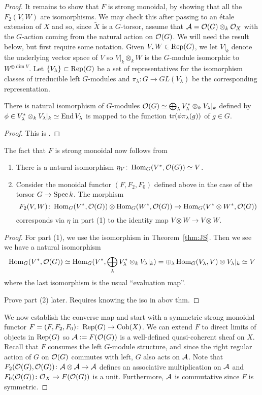 \documentclass[12pt]{amsart}
\begin{document}
\begin{proof}
It remains to show that $F$ is strong monoidal, by showing that all the $F_2(V,W)$ are isomorphisms. We may check this after passing to an \'etale extension of $X$ and so, since $\tilde{X}$ is a $G$-torsor, assume that $\mathcal{A}  = \mathcal{O}(G) \otimes_k \mathcal{O}_X$ with the $G$-action coming from the natural action on $\mathcal{O}(G)$. We will need the result below, but first require some notation. Given $V, W \in \operatorname{Rep}(G)$, we let $V|_k$ denote the underlying vector space of $V$ so $V|_k \otimes_k W$ is the $G$-module isomorphic to $W^{\oplus \dim V}$. Let $\{V_{\lambda}\}\subset \operatorname{Rep}(G)$ be a set of representatives for the isomorphism classes of irreducible left $G$-modules and $\pi_{\lambda} \colon G \to GL(V_{\lambda})$ be the corresponding representation. 
\begin{theorem}  \label{thm:JS}
There is natural isomorphism of $G$-modules 
$\mathcal{O}(G) \simeq \bigoplus_{\lambda}  V_{\lambda}^* \otimes_k V_{\lambda}|_k$ defined by $\phi \in V_{\lambda}^* \otimes_k V_{\lambda}|_k \simeq \operatorname{End} V_{\lambda}$ is mapped to the function $\operatorname{tr}(\phi \pi_{\lambda}(g))$ of $g \in G$.
\end{theorem}
\begin{proof}
This is \cite[\S2, Theorem~7, \S3, Theorem~1]{JS}.
\end{proof}
The fact that $F$ is strong monoidal now follows from
\begin{lemma}  \label{lem:HomOG}
\begin{enumerate}
    \item There is a natural isomorphism $\eta_V \colon \operatorname{Hom}_G(V^*,\mathcal{O}(G))\simeq V$.
    \item Consider the  monoidal functor $(F,F_2,F_0)$ defined above in the case of the torsor $G \to \operatorname{Spec} k$. The morphism
    $$ F_2(V,W) \colon \operatorname{Hom}_G(V^*,\mathcal{O}(G)) \otimes \operatorname{Hom}_G(W^*,\mathcal{O}(G)) \to \operatorname{Hom}_G(V^* \otimes W^*,\mathcal{O}(G))$$
    corresponds via $\eta$ in part (1) to the identity map $V \otimes W \to V \otimes W$.
\end{enumerate}
\end{lemma}
\begin{proof}
For part (1), we use the isomorphism in Theorem~\ref{thm:JS}. Then we see we have a natural isomorphism
$$ \operatorname{Hom}_G(V^*,\mathcal{O}(G)) \simeq \operatorname{Hom}_G(V^*,\bigoplus_{\lambda}  V_{\lambda}^* \otimes_k V_{\lambda}|_k) = \oplus_{\lambda} \operatorname{Hom}_G(V_{\lambda}, V) \otimes V_{\lambda}|_k \simeq V
$$
where the last isomorphism is the usual ``evaluation map''.

{\red Prove part (2) later. Requires knowing the iso in abov thm.}
\end{proof}
We now establish the converse map and start with a symmetric strong monoidal functor $F = (F,F_2,F_0) \colon \operatorname{Rep}(G) \to \operatorname{Coh}(X)$. We can extend $F$ to direct limits of objects in $\operatorname{Rep}(G)$ so $\mathcal{A} := F(\mathcal{O}(G))$ is a well-defined quasi-coherent sheaf on $X$. Recall that $F$ consumes the left $G$-module structure, and since the right regular action of $G$ on $\mathcal{O}(G)$ commutes with left, $G$ also acts on $\mathcal{A}$. Note that $F_2(\mathcal{O}(G),\mathcal{O}(G)) \colon \mathcal{A} \otimes \mathcal{A} \to \mathcal{A}$ defines an associative multiplication on $\mathcal{A}$ and $F_0(\mathcal{O}(G)) \colon \mathcal{O}_X \to F(\mathcal{O}(G))$ is a unit. Furthermore, $\mathcal{A}$ is commutative since $F$ is symmetric. 


\end{proof}
\end{document}
